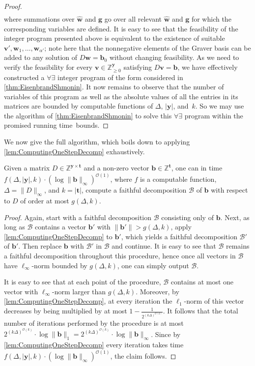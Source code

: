 \documentclass{article}
\renewcommand{\geq}{\geqslant}
\newcommand{\Bb}{\mathcal{B}}
\newcommand{\Z}{\mathbb{Z}}
\newcommand{\Zn}{\Z_{\geq 0}}
\newcommand{\tup}[1]{{\mathbf{#1}}}
\newcommand{\ww}{\tup w}
\newcommand{\whww}{{\widehat{\ww}}}
\newcommand{\yy}{\tup y}
\newcommand{\tv}{\tup t}
\newcommand{\bb}{\tup b}
\renewcommand{\gg}{\tup g}
\newcommand{\myvv}{\tup v} %
\newcommand{\matrices}[3]{#1^{#2\times #3}}
\newcommand{\Oh}{{\mathcal{O}}}
\begin{document}
\begin{proof}
\begin{align*}
\end{align*}
where summations over $\whww$ and $\gg$ go over all relevant $\whww$ and $\gg$ for which the corresponding variables are defined. It is easy to see that the feasibility of the integer program presented above is equivalent to the existence of suitable $\myvv',\ww_1,\ldots,\ww_{\alpha'}$; note here that the nonnegative elements of the Graver basis can be added to any solution of $D\ww=\bb_0$ without changing feasibility. As we need to verify the feasibility for every $\myvv\in \Zn^\yy$ satisfying $D\myvv=\bb$, we have effectively constructed a $\forall\exists$ integer program of the form considered in \cref{thm:EisenbrandShmonin}. It now remains to observe that the number of variables of this program as well as the absolute values of all the entries in its matrices are bounded by computable functions of $\Delta$, $|\yy|$, and~$k$. So we may use the algorithm of \cref{thm:EisenbrandShmonin} to solve this $\forall\exists$ program within the promised running time~bounds.
\end{proof}

We now give the full algorithm, which boils down to applying \cref{lem:ComputingOneStepDecomp} exhaustively.

\begin{lemma}\label{lem:ComputingCompleteDecomp}
Given a matrix $D\in \matrices{\Z}{\yy}{\tv}$ and a non-zero vector $\bb\in \Z^{\tv}$, one can in time $f(\Delta,|\yy|,k)\cdot (\log \|\bb\|_\infty)^{\Oh(1)}$, where $f$ is a computable function, $\Delta=\|D\|_\infty$, and $k=|\tv|$, compute a faithful decomposition $\Bb$ of $\bb$ with respect to $D$ of order at most $g(\Delta,k)$.
\end{lemma}
\begin{proof}
Again, start with a faithful decomposition $\Bb$ consisting only of $\bb$. Next, as long as $\Bb$ contains a vector $\bb'$ with $\|\bb'\|>g(\Delta,k)$, apply \cref{lem:ComputingOneStepDecomp} to $\bb'$, which yields a faithful decomposition $\Bb'$ of $\bb'$. Then replace $\bb$ with $\Bb'$ in $\Bb$ and continue. It is easy to see that $\Bb$ remains a faithful decomposition throughout this procedure, hence once all vectors in $\Bb$ have $\ell_\infty$-norm bounded by $g(\Delta,k)$, one can simply output $\Bb$.

It is easy to see that at each point of the procedure, $\Bb$ contains at most one vector with $\ell_\infty$-norm larger than $g(\Delta,k)$. Moreover, by \cref{lem:ComputingOneStepDecomp}, at every iteration the $\ell_1$-norm of this vector decreases by being multiplied by at most $1-\frac{1}{2^{(k\Delta)^{\Oh(k)}}}$. It follows that the total number of iterations performed by the procedure is at most $2^{(k\Delta)^{\Oh(k)}}\cdot \log \|\bb\|_1=2^{(k\Delta)^{\Oh(k)}}\cdot \log \|\bb\|_\infty$. Since by \cref{lem:ComputingOneStepDecomp} every iteration takes time $f(\Delta,|\yy|,k)\cdot (\log \|\bb\|_\infty)^{\Oh(1)}$, the claim follows.
\end{proof}
\end{document}
